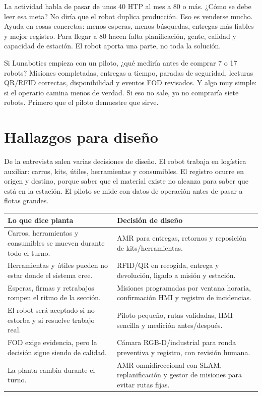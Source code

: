 \begin{interviewtranscript}
\InterviewExchange
{La actividad habla de pasar de unos 40 HTP al mes a 80 o más. ¿Cómo se debe leer esa meta?}
{No diría que el robot duplica producción. Eso es venderse mucho. Ayuda en cosas concretas: menos esperas, menos búsquedas, entregas más fiables y mejor registro. Para llegar a 80 hacen falta planificación, gente, calidad y capacidad de estación. El robot aporta una parte, no toda la solución.}

\InterviewExchange
{Si Lunabotics empieza con un piloto, ¿qué mediría antes de comprar 7 o 17 robots?}
{Misiones completadas, entregas a tiempo, paradas de seguridad, lecturas QR/RFID correctas, disponibilidad y eventos FOD revisados. Y algo muy simple: si el operario camina menos de verdad. Si eso no sale, yo no compraría siete robots. Primero que el piloto demuestre que sirve.}
\end{interviewtranscript}

\section{Hallazgos para diseño}

De la entrevista salen varias decisiones de diseño. El robot trabaja en logística auxiliar: carros, kits, útiles, herramientas y consumibles. El registro ocurre en origen y destino, porque saber que el material existe no alcanza para saber que está en la estación. El piloto se mide con datos de operación antes de pasar a flotas grandes.

\begin{longtable}{P{0.42\textwidth}P{0.50\textwidth}}
\toprule
Lo que dice planta & Decisión de diseño\\
\midrule
\endhead
Carros, herramientas y consumibles se mueven durante todo el turno. & AMR para entregas, retornos y reposición de kits/herramientas.\\
Herramientas y útiles pueden no estar donde el sistema cree. & RFID/QR en recogida, entrega y devolución, ligado a misión y estación.\\
Esperas, firmas y retrabajos rompen el ritmo de la sección. & Misiones programadas por ventana horaria, confirmación HMI y registro de incidencias.\\
El robot será aceptado si no estorba y si resuelve trabajo real. & Piloto pequeño, rutas validadas, HMI sencilla y medición antes/después.\\
FOD exige evidencia, pero la decisión sigue siendo de calidad. & Cámara RGB-D/industrial para ronda preventiva y registro, con revisión humana.\\
La planta cambia durante el turno. & AMR omnidireccional con SLAM, replanificación y gestor de misiones para evitar rutas fijas.\\
\bottomrule
\end{longtable}
